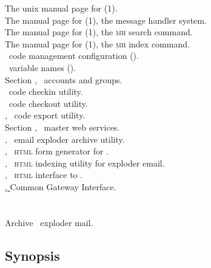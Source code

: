 The unix manual page for (1).\\
The manual page for (1), the message handler system.\\
The manual page for (1), the \textsc{mh} search command.\\
The manual page for (1), the \textsc{mh} index command.\\
\aipspp\ code management configuration ().\\
\aipspp\ variable names ().\\
Section , \aipspp\ accounts and groups.\\
 \aipspp\ code checkin utility.\\
 \aipspp\ code checkout utility.\\
, \aipspp\ code export utility.\\
Section , \aipspp\ master web services.\\
, \aipspp\ email exploder archive utility.\\
, \aipspp\ \textsc{html} form generator for .\\
, \aipspp\ \textsc{html} indexing utility for exploder email.\\
, \aipspp\ \textsc{html} interface to .\\
\href{http://hoohoo.ncsa.uiuc.edu/cgi}{, }{Common Gateway Interface}.


\newpage
\section{}
\label{aipsmail}



Archive \aipspp\ exploder mail.

\subsection*{Synopsis}

\begin{synopsis}
\end{synopsis}

